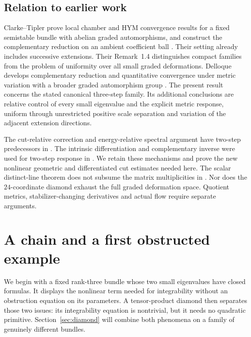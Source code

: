 \documentclass[11pt]{amsart}
\theoremstyle{definition}
\theoremstyle{remark}
\begin{document}
\subsection{Relation to earlier work}
Clarke--Tipler prove local chamber and HYM convergence results for a fixed
semistable bundle with abelian graded automorphisms, and construct the
complementary reduction on an ambient coefficient ball
\cite[Proposition~1.1, Theorem~1.2 and Propositions~3.1--3.2]{clarketipler2024}.
Their setting already includes successive extensions. Their Remark~1.4
distinguishes compact families from the problem of uniformity over all
small graded deformations. Delloque develops complementary reduction and
quantitative convergence under metric variation with a broader graded
automorphism group \cite[Propositions~4.2,4.7 and Theorems~4.8--4.9]{delloque2025}.
The present result concerns the stated canonical three-step family. Its
additional conclusions are relative control of every small eigenvalue
and the explicit metric response, uniform through unrestricted positive
scale separation and variation of the adjacent extension directions.

The cut-relative correction and energy-relative spectral argument have
two-step predecessors in \cite{wuebben2026bipartite,wuebben2026repeated}.
The intrinsic differentiation and complementary inverse were used for
two-step response in \cite{wuebben2026response}. We retain these mechanisms
and prove the new nonlinear geometric and differentiated cut estimates
needed here. The scalar distinct-line theorem does not subsume the
matrix multiplicities in \cite{wuebben2026repeated}. Nor does the
$24$-coordinate diamond exhaust the full graded deformation space.
Quotient metrics, stabilizer-changing derivatives and actual flow require
separate arguments.

\section{A chain and a first obstructed example}\label{sec:chain}

We begin with a fixed rank-three bundle whose two small eigenvalues have
closed formulas. It displays the nonlinear term needed for integrability
without an obstruction equation on its parameters. A tensor-product diamond
then separates those two issues: its integrability equation is nontrivial,
but it needs no quadratic primitive. Section~\ref{sec:diamond} will combine
both phenomena on a family of genuinely different bundles.
\end{document}
